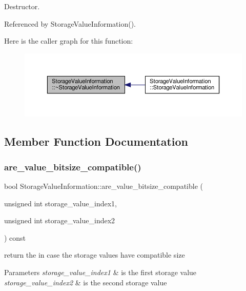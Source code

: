 Destructor. 



Referenced by Storage\+Value\+Information().

Here is the caller graph for this function\+:
\nopagebreak
\begin{figure}[H]
\begin{center}
\leavevmode
\includegraphics[width=350pt]{d8/dbe/classStorageValueInformation_add282b820dac0047dca2d2e7670338b8_icgraph}
\end{center}
\end{figure}


\subsection{Member Function Documentation}
\mbox{\label{classStorageValueInformation_a72bff182397c1bb40391d4709a30d1ce}} 
\subsubsection{\texorpdfstring{are\+\_\+value\+\_\+bitsize\+\_\+compatible()}{are\_value\_bitsize\_compatible()}}
{\footnotesize\ttfamily bool Storage\+Value\+Information\+::are\+\_\+value\+\_\+bitsize\+\_\+compatible (\begin{DoxyParamCaption}\item[{unsigned int}]{storage\+\_\+value\+\_\+index1,  }\item[{unsigned int}]{storage\+\_\+value\+\_\+index2 }\end{DoxyParamCaption}) const}



return the in case the storage values have compatible size 


\begin{DoxyParams}{Parameters}
{\em storage\+\_\+value\+\_\+index1} & is the first storage value \\
\hline
{\em storage\+\_\+value\+\_\+index2} & is the second storage value \\
\hline
\end{DoxyParams}


